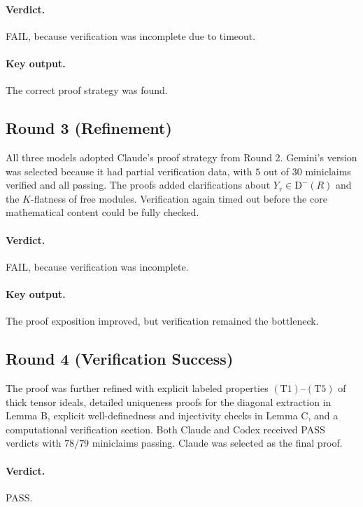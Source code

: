\documentclass[11pt]{article}
\newcommand{\Db}{\mathrm{D}^{-}(R)}
\begin{document}
\paragraph{Verdict.}
FAIL, because verification was incomplete due to timeout.

\paragraph{Key output.}
The correct proof strategy was found.

\subsection{Round 3 (Refinement)}

All three models adopted Claude's proof strategy from Round 2. Gemini's version was selected because it had partial verification data, with $5$ out of $30$ miniclaims verified and all passing. The proofs added clarifications about $Y_r \in \Db$ and the $K$-flatness of free modules. Verification again timed out before the core mathematical content could be fully checked.

\paragraph{Verdict.}
FAIL, because verification was incomplete.

\paragraph{Key output.}
The proof exposition improved, but verification remained the bottleneck.

\subsection{Round 4 (Verification Success)}

The proof was further refined with explicit labeled properties $(\mathrm{T1})$--$(\mathrm{T5})$ of thick tensor ideals, detailed uniqueness proofs for the diagonal extraction in Lemma B, explicit well-definedness and injectivity checks in Lemma C, and a computational verification section. Both Claude and Codex received PASS verdicts with $78/79$ miniclaims passing. Claude was selected as the final proof.

\paragraph{Verdict.}
PASS.
\end{document}

